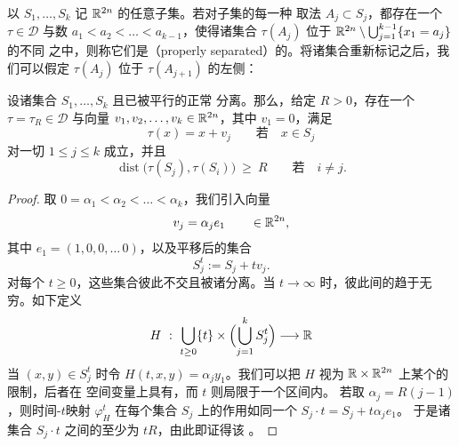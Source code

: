 \begin{definition}\label{def:properly-separated}
以 $S_{1},\dots,S_{k}$ 记 $\mathbb{R}^{2n}$ 的任意子集。若对\trBounded{}子集的每一种%
取法 $A_{j}\subset S_{j}$，都存在一个\trMapping{} $\tau\in\mathcal{D}$ 与数%
$a_{1}<a_{2}<\dots<a_{k-1}$，使得诸集合 $\tau(A_{j})$ 位于%
$\mathbb{R}^{2n}\setminus\bigcup_{j=1}^{k-1}\{x_{1}=a_{j}\}$ 的不同%
\trConnectedComponent{}之中，则称它们是\textbf{\trProperlySeparated}（properly %
 separated）的。将诸集合重新标记之后，我们可以假定 $\tau(A_{j})$ 位于%
$\tau(A_{j+1})$ 的左侧：
\begin{center}
\end{center}
\end{definition}

\begin{lemma}\label{lem:translation-separation}
设诸集合 $S_{1},\dots,S_{k}$ \trBounded{}且已被平行的\trHyperplane{}正常%
分离。那么，给定 $R>0$，存在一个\trMapping{} $\tau=\tau_{R}\in\mathcal{D}$%
与向量 $v_{1},v_{2},\dots,v_{k}\in\mathbb{R}^{2n}$，其中 $v_{1}=0$，满足
\[
\tau(x)=x+v_{j}\qquad\text{若}\quad x\in S_{j}
\]
对一切 $1\leq j\leq k$ 成立，并且
\[
\operatorname{dist}\bigl(\tau(S_{j}),\tau(S_{i})\bigr)\ \geq\ R\qquad\text{若}%
\quad i\neq j.
\]
\end{lemma}

\begin{proof}
取 $0=\alpha_{1}<\alpha_{2}<\dots<\alpha_{k}$，我们引入向量
\[
v_{j}=\alpha_{j}e_{1}\qquad\in\mathbb{R}^{2n},
\]
其中 $e_{1}=(1,0,0,\dots\,0)$，以及平移后的集合
\[
S_{j}^{t}:=S_{j}+tv_{j}.
\]
对每个 $t\geq0$，这些集合彼此不交且被诸\trHyperplane{}分离。当%
$t\to\infty$ 时，彼此间的\trDistance{}趋于无穷。如下定义\trMapping
\[
H\ :\ \bigcup_{t\geq0}\{t\}\times\Bigl(\bigcup_{j=1}^{k}S_{j}^{t}\Bigr)%
\longrightarrow\R
\]
当 $(x,y)\in S_{j}^{t}$ 时令 $H(t,x,y)=\alpha_{j}y_{1}$。我们可以把 $H$ 视为%
$\mathbb{R}\times\mathbb{R}^{2n}$ 上某个\trSmooth{}\trHamiltonianFunction{}的限制，后者在%
空间变量上具有\trCompactSupport，而 $t$ 则局限于一个\trCompact{}区间内。%
若取 $\alpha_{j}=R(j-1)$，则时间-$t$映射 $\varphi_{H}^{t}$ 在每个集合%
$S_{j}$ 上的作用如同一个\trTranslation{} $S_{j}\cdot t=S_{j}+t\alpha_{j}e_{1}$。%
于是诸集合 $S_{j}\cdot t$ 之间的\trDistance{}至少为 $tR$，由此即证得该%
\trhLemma。
\end{proof}

